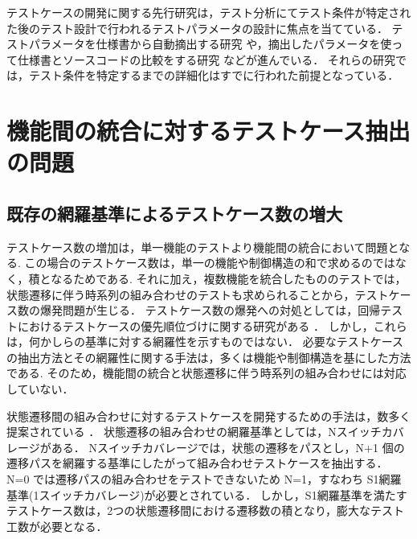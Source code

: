 テストケースの開発に関する先行研究は，テスト分析にてテスト条件が特定された後のテスト設計で行われるテストパラメータの設計に焦点を当てている．
\cite{ammann1994using}
\cite{grochtmann1993classification}
\cite{demillo1978hints}
\cite{lehmann2000test}
テストパラメータを仕様書から自動摘出する研究
\cite{masuda2015semantic}
\cite{masuda2016detecting}
や，摘出したパラメータを使って仕様書とソースコードの比較をする研究
\cite{uetsuki2013efficient}
\cite{uetsuki2017improvement}
\cite{uetsuki2011software}
\cite{uetsuki2012decision}
などが進んでいる．
それらの研究では，テスト条件を特定するまでの詳細化はすでに行われた前提となっている．

\newpage
\section{機能間の統合に対するテストケース抽出の問題} \label{sec:2-3}
\subsection{既存の網羅基準によるテストケース数の増大}
テストケース数の増加は，単一機能のテストより機能間の統合において問題となる\cite{rehman2007testing}.
この場合のテストケース数は，単一の機能や制御構造の和で求めるのではなく，積となるためである.
それに加え，複数機能を統合したもののテストでは，状態遷移に伴う時系列の組み合わせのテストも求められることから，テストケース数の爆発問題が生じる．
テストケース数の爆発への対処としては，回帰テストにおけるテストケースの優先順位づけに関する研究がある\cite{rothermel2001prioritizing}
\cite{elbaum2000prioritizing}．
しかし，これらは，何かしらの基準に対する網羅性を示すものではない．
必要なテストケースの抽出方法とその網羅性に関する手法は，多くは機能や制御構造を基にした方法である.
そのため，機能間の統合と状態遷移に伴う時系列の組み合わせには対応していない．

状態遷移間の組み合わせに対するテストケースを開発するための手法は，数多く提案されている
\cite{whittaker1994markov}
\cite{lee1996principles}
\cite{fujiwara1991test}
\cite{andrews2005testing}．
状態遷移の組み合わせの網羅基準としては，Nスイッチカバレージがある．
Nスイッチカバレージでは，状態の遷移をパスとし，N+1 個の遷移パスを網羅する基準にしたがって組み合わせテストケースを抽出する\cite{chow1978testing}．
N=0 では遷移パスの組み合わせをテストできないため N=1，すなわち S1網羅基準(1スイッチカバレージ)が必要とされている．
しかし，S1網羅基準を満たすテストケース数は，2つの状態遷移間における遷移数の積となり，膨大なテスト工数が必要となる．


